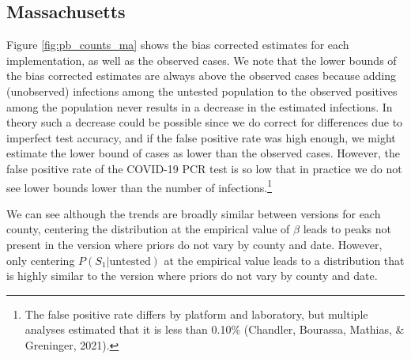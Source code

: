 \documentclass[12pt,twoside]{smiththesis}
\begin{document}
\hypertarget{massachusetts}{%
\subsection{Massachusetts}\label{massachusetts}}

Figure \ref{fig:pb_counts_ma} shows the bias corrected estimates for each implementation, as well as the observed cases. We note that the lower bounds of the bias corrected estimates are always above the observed cases because adding (unobserved) infections among the untested population to the observed positives among the population never results in a decrease in the estimated infections. In theory such a decrease could be possible since we do correct for differences due to imperfect test accuracy, and if the false positive rate was high enough, we might estimate the lower bound of cases as lower than the observed cases. However, the false positive rate of the COVID-19 PCR test is so low that in practice we do not see lower bounds lower than the number of infections.\footnote{The false positive rate differs by platform and laboratory, but multiple analyses estimated that it is less than 0.10\% (Chandler, Bourassa, Mathias, \& Greninger, 2021).}

We can see although the trends are broadly similar between versions for each county, centering the distribution at the empirical value of \(\beta\) leads to peaks not present in the version where priors do not vary by county and date. However, only centering \(P(S_1|\text{untested})\) at the empirical value leads to a distribution that is highly similar to the version where priors do not vary by county and date.
\end{document}
